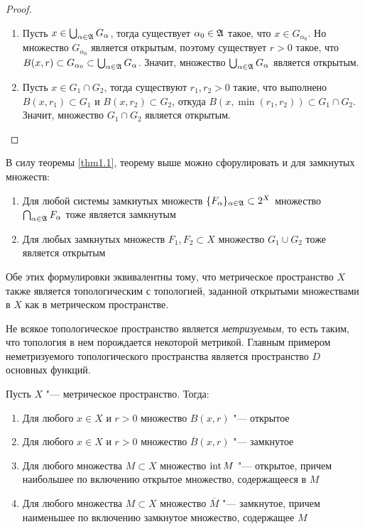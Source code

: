 \begin{proof}~
	\begin{enumerate}
		\item Пусть $x \in \bigcup_{\alpha \in \mathfrak A} G_\alpha$, тогда существует $\alpha_0 \in \mathfrak A$ такое, что $x \in G_{\alpha_0}$. Но множество $G_{\alpha_0}$ является открытым, поэтому существует $r > 0$ такое, что $B(x, r) \subset G_{\alpha_0} \subset \bigcup_{\alpha \in \mathfrak A} G_{\alpha}$. Значит, множество $\bigcup_{\alpha \in \mathfrak A} G_{\alpha}$ является открытым.

		\item Пусть $x \in G_1 \cap G_2$, тогда существуют $r_1, r_2 > 0$ такие, что выполнено $B(x, r_1) \subset G_1$ и $B(x, r_2) \subset G_2$, откуда $B(x, \min(r_1, r_2)) \subset G_1 \cap G_2$. Значит, множество $G_1 \cap G_2$ является открытым.\qedhere
	\end{enumerate}
\end{proof}

\begin{note}
	В силу теоремы \ref{thm1.1}, теорему выше можно сфорулировать и для замкнутых множеств:
	\begin{enumerate}
		\item Для любой системы замкнутых множеств $\{F_\alpha\}_{\alpha \in \mathfrak A} \subset 2^X$ множество $\bigcap_{\alpha \in \mathfrak A} F_{\alpha}$ тоже является замкнутым

		\item Для любых замкнутых множеств $F_1, F_2 \subset X$ множество $G_1 \cup G_2$ тоже является открытым
	\end{enumerate}

	Обе этих формулировки эквивалентны тому, что метрическое пространство $X$ также является топологическим с топологией, заданной открытыми множествами в $X$ как в метрическом пространстве.
\end{note}

\begin{note}
	Не всякое топологическое пространство является \textit{метризуемым}, то есть таким, что топология в нем порождается некоторой метрикой. Главным примером неметризуемого топологического пространства является пространство $D$ основных функций.
\end{note}

\begin{theorem}\label{thm1.3}
	Пусть $X$ "--- метрическое пространство. Тогда:
	\begin{enumerate}
		\item Для любого $x \in X$ и $r > 0$ множество $B(x, r)$ "--- открытое
		\item Для любого $x \in X$ и $r > 0$ множество $\overline B(x, r)$ "--- замкнутое
		\item Для любого множества $M \subset X$ множество $\operatorname{int} M$ "--- открытое, причем наибольшее по включению открытое множество, содержащееся в $M$
		\item Для любого множества $M \subset X$ множество $\overline M$ "--- замкнутое, причем наименьшее по включению замкнутое множество, содержащее $M$
	\end{enumerate}
\end{theorem}

